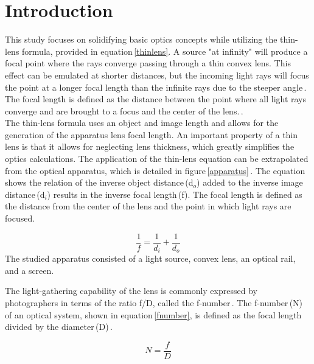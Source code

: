 \documentclass[twocolumn]{aastex6}
\begin{document}
\section{Introduction}
This study focuses on solidifying basic optics concepts while utilizing the thin-lens formula, provided in equation\,\ref{thinlens}. A source "at infinity" will produce a focal point where the rays converge passing through a thin convex lens. This effect can be emulated at shorter distances, but the incoming light rays will focus the point at a longer focal length than the infinite rays due to the steeper angle\,\cite{4}. The focal length is defined as the distance between the point where all light rays converge and are brought to a focus and the center of the lens.\,\cite{3}. 
\\
\indent The thin-lens formula uses an object and image length and allows for the generation of the apparatus lens focal length. An important property of a thin lens is that it allows for neglecting lens thickness, which greatly simplifies the optics calculations. The application of the thin-lens equation can be extrapolated from the optical apparatus, which is detailed in figure\,\ref{apparatus}\,\cite{1}. The equation shows the relation of the inverse object distance\,(d$_{o}$) added to the inverse image distance\,(d$_{i}$) results in the inverse focal length\,(f). The focal length is defined as the distance from the center of the lens and the point in which light rays are focused.

\begin{equation}
\frac{1}{f}=\frac{1}{d_i}+\frac{1}{d_o}
\label{thinlens}
\end{equation}
The studied apparatus consisted of a light source, convex lens, an optical rail, and a screen. 

The light-gathering capability of the lens is commonly expressed by photographers in terms of the ratio f/D, called the f-number\,\cite{3}. The f-number\,(N) of an optical system, shown in equation\,\ref{fnumber}, is defined as the focal length divided by the diameter\,(D)\,\cite{2}. 

\begin{equation}
N = \frac{f}{D}
\label{fnumber}
\end{equation}
\end{document}
